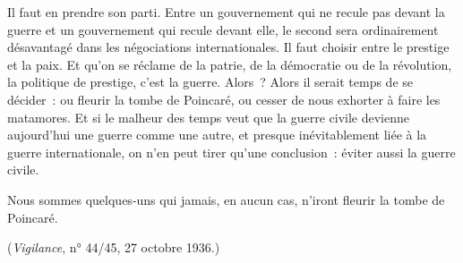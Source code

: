\documentclass[french,twoside]{book} %
\begin{document}
Il faut en prendre son parti. Entre un gouvernement qui ne recule pas devant la guerre et un gouvernement qui recule devant elle, le second sera ordinairement désavantagé dans les négociations internationales. Il faut choisir entre le prestige et la paix. Et qu'on se réclame de la patrie, de la démocratie ou de la révolution, la politique de prestige, c'est la guerre. Alors ? Alors il serait temps de se décider : ou fleurir la tombe de Poincaré, ou cesser de nous exhorter à faire les matamores. Et si le malheur des temps veut que la guerre civile devienne aujourd'hui une guerre comme une autre, et presque inévitablement liée à la guerre internationale, on n'en peut tirer qu'une con­clusion : éviter aussi la guerre civile.\par
Nous sommes quelques-uns qui jamais, en aucun cas, n'iront fleurir la tombe de Poincaré.\par
({\itshape Vigilance}, n° 44/45, 27 octobre 1936.)\par
\end{document}
